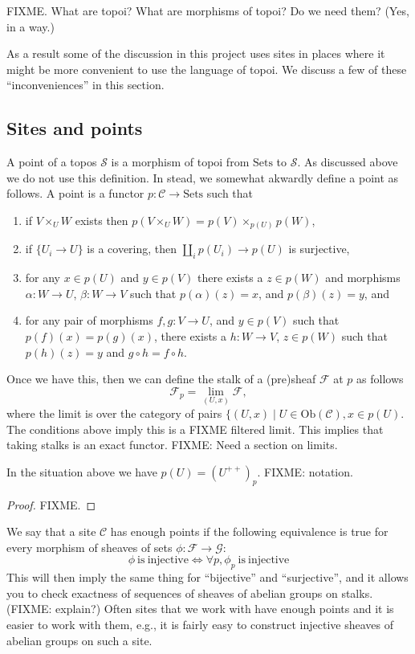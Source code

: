 \smallskip\noindent
FIXME. What are topoi? What are morphisms of topoi? Do we need them? (Yes, in a
way.)

\smallskip\noindent
As a result some of the discussion in this project uses sites in places where
it might be more convenient to use the language of topoi. We discuss a few
of these ``inconveniences'' in this section.

\subsection{Sites and points}
\label{subsection-points}

\noindent
A point of a topos $\mathcal{S}$ is a morphism of topoi from $\text{Sets}$ to
$\mathcal{S}$. As discussed above we do not use this definition. In stead, we
somewhat akwardly define a point as follows. A point is a functor
$p : \mathcal{C} \to \text{Sets}$ such that
\begin{enumerate}
\item if $V\times_U W$ exists then $p(V\times_U W)=p(V)\times_{p(U)}p(W)$,
\item if $\{U_i \to U\}$ is a covering, then $\coprod_i p(U_i) \to p(U)$ is
surjective,
\item for any $x\in p(U)$ and $y\in p(V)$ there exists a $z\in p(W)$ and
morphisms $\alpha:W \to U$, $\beta:W \to V$ such that $p(\alpha)(z)=x$,
and $p(\beta)(z)=y$, and
\item for any pair of morphisms $f,g : V \to U$, and $y\in p(V)$ such
that $p(f)(x)=p(g)(x)$, there exists a $h: W \to V$, $z\in p(W)$ such that
$p(h)(z)=y$ and $g\circ h = f \circ h$.
\end{enumerate}
Once we have this, then we can define the stalk of a (pre)sheaf $\mathcal{F}$
at $p$ as follows
$$
\mathcal{F}_p = \lim_{(U,x)} \mathcal{F},
$$
where the limit is over the category of pairs 
$\{(U,x) \mid U \in \text{Ob}(\mathcal{C}), x\in p(U)$. The conditions
above imply this is a FIXME filtered limit. This implies that taking
stalks is an exact functor. FIXME: Need a section on limits.

\begin{lemma}
\label{lemma-points-recover}
In the situation above we have $p(U) = (U^{++})_p$. FIXME: notation.
\end{lemma}

\begin{proof}
FIXME.
\end{proof}

\noindent
We say that a site $\mathcal{C}$ has enough points if the following equivalence
is true for every morphism of sheaves of sets 
$\phi : \mathcal{F} \to \mathcal{G}$:
$$
\phi\ \text{is}\ \text{injective} 
\Leftrightarrow 
\forall p, \phi_p\ \text{is}\ \text{injective} 
$$
This will then imply the same thing for ``bijective'' and ``surjective'', and
it allows you to check exactness of sequences of sheaves of abelian groups
on stalks. (FIXME: explain?) Often sites that we work with have enough points
and it is easier to work with them, e.g., it is fairly easy to construct
injective sheaves of abelian groups on such a site.







